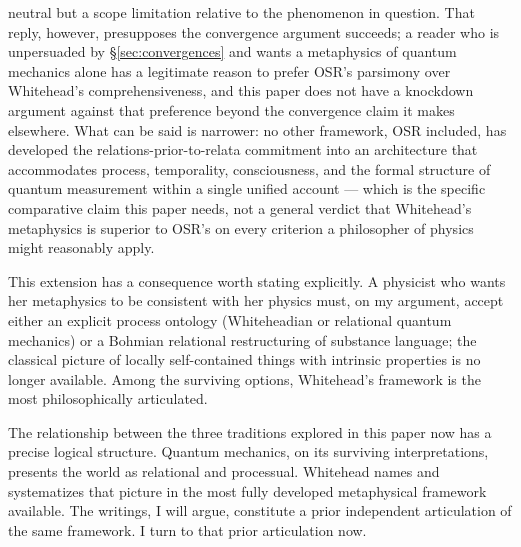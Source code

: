 neutral but a scope limitation relative to the phenomenon in question.
That reply, however, presupposes the convergence argument succeeds; a
reader who is unpersuaded by \S\ref{sec:convergences} and wants a
metaphysics of quantum mechanics alone has a legitimate reason to prefer
OSR's parsimony over Whitehead's comprehensiveness, and this paper does
not have a knockdown argument against that preference beyond the
convergence claim it makes elsewhere.
What can be said is narrower: no other framework, OSR included, has
developed the relations-prior-to-relata commitment into an architecture
that accommodates process, temporality, consciousness, and the formal
structure of quantum measurement within a single unified account ---
which is the specific comparative claim this paper needs, not a general
verdict that Whitehead's metaphysics is superior to OSR's on every
criterion a philosopher of physics might reasonably apply.

This extension has a consequence worth stating explicitly.
A physicist who wants her metaphysics to be consistent with her physics
must, on my argument, accept either an explicit process ontology
(Whiteheadian or relational quantum mechanics) or a Bohmian relational
restructuring of substance language; the classical picture of locally
self-contained things with intrinsic properties is no longer available.
Among the surviving options, Whitehead's framework is the most
philosophically articulated.

The relationship between the three traditions explored in this paper now
has a precise logical structure.
Quantum mechanics, on its surviving interpretations, presents the world
as relational and processual.
Whitehead names and systematizes that picture in the most fully developed
metaphysical framework available.
The \bahai writings, I will argue, constitute a prior independent
articulation of the same framework.
I turn to that prior articulation now.
